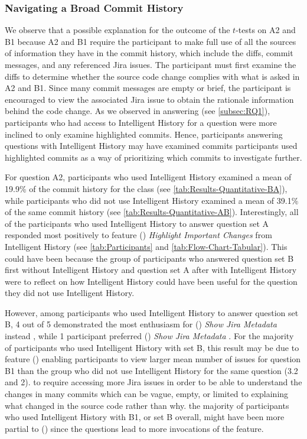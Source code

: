 \subsubsection{Navigating a Broad Commit History}

We observe that a possible explanation for the outcome of the $t$-tests on A2 and B1 
because A2 and B1 require the participant to make full use of all the sources of
information they have in the commit history, which include the diffs, commit messages,
and any referenced Jira issues.
The participant must first examine the diffs to determine whether the source code change
complies with what is asked in A2 and B1.
Since many commit messages are empty or brief, the participant is encouraged to view
the associated Jira issue to obtain the rationale information behind the code change.
As we observed in answering  (see \autoref{subsec:RQ1}), 
participants who had access to Intelligent History for a question
were more inclined to only examine highlighted commits.
Hence, participants answering questions with Intelligent History may have examined  commits
 participants used highlighted commits as a way of prioritizing which commits to investigate further.

For question A2, participants who used Intelligent History examined a mean of 19.9\% of the commit history for the  class (see \autoref{tab:Results-Quantitative-BA}),
while participants who did not use Intelligent History examined a mean of 39.1\% of the same commit history (see \autoref{tab:Results-Quantitative-AB}). 
Interestingly, all of the participants who used Intelligent History to answer question set A 
responded most positively to feature () \textit{Highlight Important Changes} from Intelligent History  
(see \autoref{tab:Participants} and \autoref{tab:Flow-Chart-Tabular}).
This could have been because the group of participants who answered question set B first without Intelligent History 
and question set A after with Intelligent History were to reflect on how Intelligent History 
could have been useful for the question  they did not use Intelligent History.

However, among participants who used Intelligent History to answer question set B,
4 out of 5  demonstrated the most enthusiasm for () \textit{Show Jira Metadata} instead ,
while 1 participant preferred () \textit{Show Jira Metadata} .
For the majority of participants who used Intelligent History with set B, this result may be due
to feature () enabling participants to view  larger mean number of issues for question B1 than the 
group who did not use Intelligent History for the same question (3.2 and 2).
 to require accessing more Jira issues in order to be able
to understand the changes in many commits which can be vague, empty, or limited to explaining
what changed in the source code rather than why.
 the majority of participants who used Intelligent History
with B1, or set B overall, might have been more partial to () since the questions
lead to more invocations of the feature.

